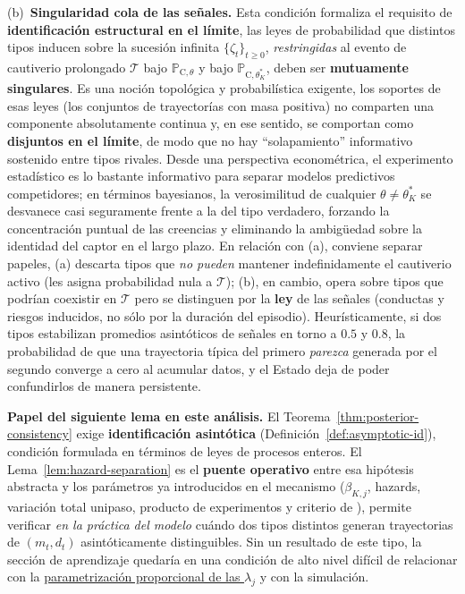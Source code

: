 \documentclass[12pt]{article}
\providecommand{\textcite}{\citet}
\theoremstyle{definition}
\theoremstyle{remark}
\newcommand{\ProbC}[1]{\mathbb{P}_{\mathrm{C},#1}}
\newcommand{\1}{\mathbf{1}}
\begin{document}
\textup{(b)}~\textbf{Singularidad cola de las señales.} Esta condición formaliza el requisito de \textbf{identificación estructural en el límite}, las leyes de probabilidad que distintos tipos inducen sobre la sucesión infinita $\{\zeta_t\}_{t\ge 0}$, \emph{restringidas} al evento de cautiverio prolongado $\mathcal{T}$ bajo $\ProbC{\theta}$ y bajo $\ProbC{\theta_K^\ast}$, deben ser \textbf{mutuamente singulares}. Es una noción topológica y probabilística exigente, los soportes de esas leyes \textup{(}los conjuntos de trayectorías con masa positiva\textup{)} no comparten una componente absolutamente continua y, en ese sentido, se comportan como \textbf{disjuntos en el límite}, de modo que no hay ``solapamiento'' informativo sostenido entre tipos rivales. Desde una perspectiva econométrica, el experimento estadístico es lo bastante informativo para separar modelos predictivos competidores; en términos bayesianos, la verosimilitud de cualquier $\theta\neq\theta_K^\ast$ se desvanece casi seguramente frente a la del tipo verdadero, forzando la concentración puntual de las creencias y eliminando la ambigüedad sobre la identidad del captor en el largo plazo. En relación con \textup{(a)}, conviene separar papeles, \textup{(a)} descarta tipos que \emph{no pueden} mantener indefinidamente el cautiverio activo \textup{(}les asigna probabilidad nula a $\mathcal{T}$\textup{)}; \textup{(b)}, en cambio, opera sobre tipos que podrían coexistir en $\mathcal{T}$ pero se distinguen por la \textbf{ley} de las señales \textup{(}conductas y riesgos inducidos, no sólo por la duración del episodio\textup{)}. Heurísticamente, si dos tipos estabilizan promedios asintóticos de señales en torno a $0.5$ y $0.8$, la probabilidad de que una trayectoria típica del primero \emph{parezca} generada por el segundo converge a cero al acumular datos, y el Estado deja de poder confundirlos de manera persistente.


\medskip\noindent\textbf{Papel del siguiente lema en este análisis.} El Teorema~\ref{thm:posterior-consistency} exige \textbf{identificación asintótica} \textup{(}Definición~\ref{def:asymptotic-id}\textup{)}, condición formulada en términos de leyes de procesos enteros. El Lema~\ref{lem:hazard-separation} es el \textbf{puente operativo} entre esa hipótesis abstracta y los parámetros ya introducidos en el mecanismo \textup{(}$\beta_{K,j}$, hazards, variación total unipaso, producto de experimentos y criterio de \textcite{Kakutani1948}\textup{)}, permite verificar \emph{en la práctica del modelo} cuándo dos tipos distintos generan trayectorias de $(m_t,d_t)$ asintóticamente distinguibles. Sin un resultado de este tipo, la sección de aprendizaje quedaría en una condición de alto nivel difícil de relacionar con la \hyperref[subsec:intensidades-prop]{parametrización proporcional de las $\lambda_j$} y con la simulación.
\end{document}
